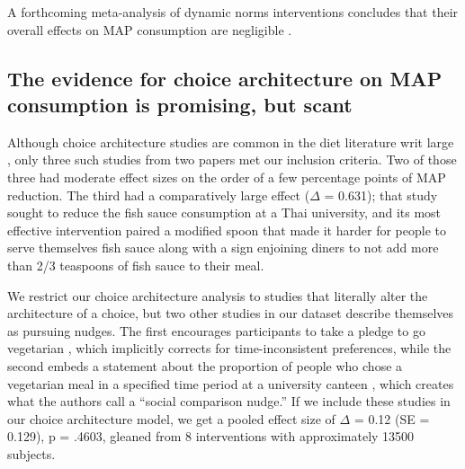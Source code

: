 \documentclass[sn-nature,referee,pdflatex]{sn-jnl}
\begin{document}
A forthcoming meta-analysis of dynamic norms interventions concludes
that their overall effects on MAP consumption are negligible
\citep{Weikertova2024}.

\begin{comment} say something about dannenberg 2024 or the 2024 meta-analysis that finds vey little?
\end{comment}

\subsection{The evidence for choice architecture on MAP consumption is
promising, but scant}\label{sec2.5}

Although choice architecture studies are common in the diet literature
writ large \citep{olafsson2024, cadario2020, szaszi2018}, only three
such studies from two papers \citep{kanchanachitra2020, andersson2021}
met our inclusion criteria. Two of those three had moderate effect sizes
on the order of a few percentage points of MAP reduction. The third had
a comparatively large effect (\(\Delta\) = 0.631); that study sought to
reduce the fish sauce consumption at a Thai university, and its most
effective intervention paired a modified spoon that made it harder for
people to serve themselves fish sauce along with a sign enjoining diners
to not add more than 2/3 teaspoons of fish sauce to their meal.

\begin{comment}
Arguably this second component  means that this study no longer qualifies as choice architecture because the message is not intended to act on unconscious processes; we include it because there is no reported enforcement mechanism and the modified spoon is a distinctly architectural change.
\end{comment}

We restrict our choice architecture analysis to studies that literally
alter the architecture of a choice, but two other studies in our dataset
describe themselves as pursuing nudges. The first encourages
participants to take a pledge to go vegetarian \citep{banerjee2019},
which implicitly corrects for time-inconsistent preferences, while the
second embeds a statement about the proportion of people who chose a
vegetarian meal in a specified time period at a university canteen
\citep{griesoph2021}, which creates what the authors call a ``social
comparison nudge.'' If we include these studies in our choice
architecture model, we get a pooled effect size of \(\Delta\) = 0.12 (SE
= 0.129), p = .4603, gleaned from 8 interventions with approximately
13500 subjects.
\end{document}
